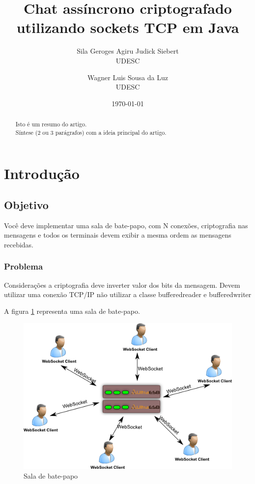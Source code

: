 \documentclass[a4paper,12pt]{article}
\title{Chat assíncrono criptografado utilizando  sockets TCP em Java}
\author{Sila Geroges Agiru Judick Siebert\\UDESC
        \and Wagner Luis Sousa da Luz \\UDESC}
\date{\today}
\begin{document}
\maketitle

\begin{abstract}
\noindent Isto é um resumo do artigo.\\
Síntese (2 ou 3 parágrafos) com a ideia principal do artigo.
\end{abstract}


\section{Introdução}
\subsection{Objetivo}
Você deve implementar uma sala de bate-papo, com N conexões, criptografia nas mensagens e todos
os terminais devem exibir a mesma ordem as mensagens recebidas.
\subsubsection{Problema}
Considerações
a criptografia deve inverter valor dos bits da mensagem.
Devem utilizar uma conexão TCP/IP
não utilizar a classe bufferedreader e bufferedwriter
              
A figura \ref{fig1} representa uma sala de bate-papo.
\begin{figure}[H]
	\includegraphics[scale=0.63]{img/454.png}    
	\caption{Sala de bate-papo}
	\label{fig1}     
\end{figure} 
\end{document}
